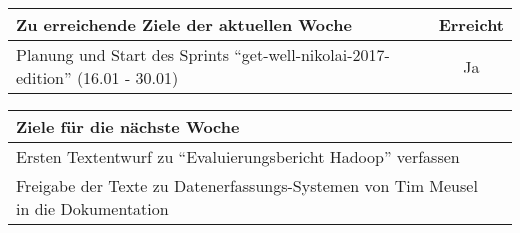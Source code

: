\begin{tabularx}{\textwidth}{Xc}
    \arrayrulecolor{OliveGreen}
    \toprule
    {\bfseries Zu erreichende Ziele der aktuellen Woche} & {\bfseries Erreicht} \\
    \midrule[2pt]
    Planung und Start des Sprints ``get-well-nikolai-2017-edition''
    (16.01 - 30.01)  &  Ja  \\
    \bottomrule[2pt]
\end{tabularx}
%
\vspace{1cm}
%
\begin{tabularx}{\textwidth}{Xc}
    \arrayrulecolor{OliveGreen}
    \toprule
    {\bfseries Ziele für die nächste Woche}              &                   \\
    \midrule[2pt]
    Ersten Textentwurf zu ``Evaluierungsbericht Hadoop'' verfassen  &  \\
    \rowcolor{OliveGreen!15}
    Freigabe der Texte zu Datenerfassungs-Systemen von Tim Meusel in die
    Dokumentation  &  \\
\end{tabularx}
